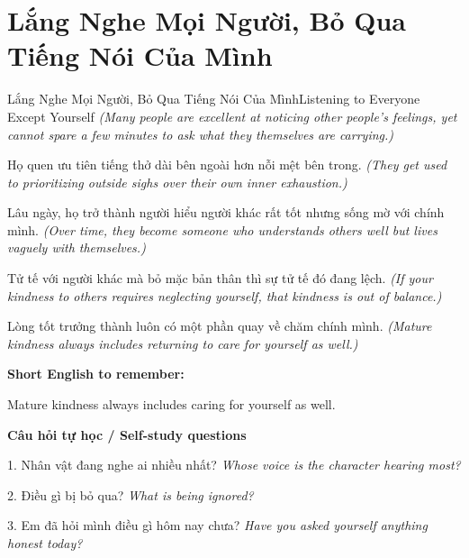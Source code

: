 \section{Lắng Nghe Mọi Người, Bỏ Qua Tiếng Nói Của Mình}
\begin{truyen}{Lắng Nghe Mọi Người, Bỏ Qua Tiếng Nói Của Mình}{Listening to Everyone Except Yourself}
\textit{(Many people are excellent at noticing other people’s feelings, yet cannot spare a few minutes to ask what they themselves are carrying.)}

Họ quen ưu tiên tiếng thở dài bên ngoài hơn nỗi mệt bên trong.
\textit{(They get used to prioritizing outside sighs over their own inner exhaustion.)}

Lâu ngày, họ trở thành người hiểu người khác rất tốt nhưng sống mờ với chính mình.
\textit{(Over time, they become someone who understands others well but lives vaguely with themselves.)}

Tử tế với người khác mà bỏ mặc bản thân thì sự tử tế đó đang lệch.
\textit{(If your kindness to others requires neglecting yourself, that kindness is out of balance.)}

\end{truyen}

\begin{baihoc}
Lòng tốt trưởng thành luôn có một phần quay về chăm chính mình.
\textit{(Mature kindness always includes returning to care for yourself as well.)}
\end{baihoc}

\begin{ghinhoanh}
\textbf{Short English to remember:}

Mature kindness always includes caring for yourself as well.

\end{ghinhoanh}

\begin{tuhocnhanh}
\textbf{Câu hỏi tự học / Self-study questions}

1. Nhân vật đang nghe ai nhiều nhất? \textit{Whose voice is the character hearing most?}

2. Điều gì bị bỏ qua? \textit{What is being ignored?}

3. Em đã hỏi mình điều gì hôm nay chưa? \textit{Have you asked yourself anything honest today?}
\end{tuhocnhanh}
\ngancach

